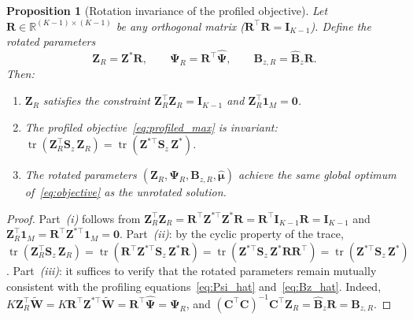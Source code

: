 \documentclass{article}
\newtheorem{proposition}[theorem]{Proposition}
\DeclareMathOperator{\tr}{tr}
\begin{document}
\begin{proposition}[Rotation invariance of the profiled objective]
\label{prop:rotation_invariance}
Let $\mathbf{R}\in\mathbb{R}^{(K-1)\times(K-1)}$ be any orthogonal
matrix ($\mathbf{R}^{\!\top}\mathbf{R} = \mathbf{I}_{K-1}$). Define
the rotated parameters
\begin{equation}
  \mathbf{Z}_R = \mathbf{Z}^*\mathbf{R}, \qquad
  \boldsymbol{\Psi}_R = \mathbf{R}^{\!\top}\hat{\boldsymbol{\Psi}}, \qquad
  \mathbf{B}_{z,R} = \hat{\mathbf{B}}_z\mathbf{R}.
  \label{eq:rotated_params}
\end{equation}
Then:
\begin{enumerate}
  \item[\emph{(i)}]
    $\mathbf{Z}_R$ satisfies the constraint
    $\mathbf{Z}_R^{\!\top}\mathbf{Z}_R = \mathbf{I}_{K-1}$ and
    $\mathbf{Z}_R^{\!\top}\mathbf{1}_M = \mathbf{0}$.
  \item[\emph{(ii)}]
    The profiled objective~\eqref{eq:profiled_max} is invariant:
    $\tr(\mathbf{Z}_R^{\!\top}\mathbf{S}_z\,\mathbf{Z}_R)
     = \tr(\mathbf{Z}^{*\top}\mathbf{S}_z\,\mathbf{Z}^*)$.
  \item[\emph{(iii)}]
    The rotated parameters $(\mathbf{Z}_R,\boldsymbol{\Psi}_R,
    \mathbf{B}_{z,R},\hat{\boldsymbol{\mu}})$ achieve the same
    global optimum of~\eqref{eq:objective} as the unrotated solution.
\end{enumerate}
\end{proposition}
 
\begin{proof}
Part~\emph{(i)} follows from
$\mathbf{Z}_R^{\!\top}\mathbf{Z}_R
 = \mathbf{R}^{\!\top}\mathbf{Z}^{*\top}\mathbf{Z}^*\mathbf{R}
 = \mathbf{R}^{\!\top}\mathbf{I}_{K-1}\mathbf{R}
 = \mathbf{I}_{K-1}$
and $\mathbf{Z}_R^{\!\top}\mathbf{1}_M
 = \mathbf{R}^{\!\top}\mathbf{Z}^{*\top}\mathbf{1}_M
 = \mathbf{0}$.
Part~\emph{(ii)}: by the cyclic property of the trace,
$\tr(\mathbf{Z}_R^{\!\top}\mathbf{S}_z\,\mathbf{Z}_R)
 = \tr(\mathbf{R}^{\!\top}\mathbf{Z}^{*\top}\mathbf{S}_z\,
       \mathbf{Z}^*\mathbf{R})
 = \tr(\mathbf{Z}^{*\top}\mathbf{S}_z\,\mathbf{Z}^*
       \mathbf{R}\mathbf{R}^{\!\top})
 = \tr(\mathbf{Z}^{*\top}\mathbf{S}_z\,\mathbf{Z}^*)$.
Part~\emph{(iii)}: it suffices to verify that the rotated parameters
remain mutually consistent with the profiling
equations~\eqref{eq:Psi_hat} and~\eqref{eq:Bz_hat}. Indeed,
$K\mathbf{Z}_R^{\!\top}\widetilde{\mathbf{W}}
 = K\mathbf{R}^{\!\top}\mathbf{Z}^{*\top}\widetilde{\mathbf{W}}
 = \mathbf{R}^{\!\top}\hat{\boldsymbol{\Psi}}
 = \boldsymbol{\Psi}_R$,
and
$(\mathbf{C}^{\!\top}\mathbf{C})^{-1}\mathbf{C}^{\!\top}\mathbf{Z}_R
 = \hat{\mathbf{B}}_z\mathbf{R} = \mathbf{B}_{z,R}$.
\end{proof}
 
\end{document}
